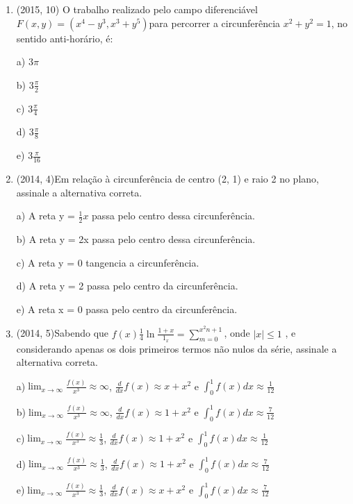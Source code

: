 \documentclass{article}
\begin{document}
\begin{enumerate}
\item (2015, 10) O trabalho realizado pelo campo diferenciável 
$F ( x , y)= ( x^4 - y^3 , x^3 + y^5 )$para percorrer a circunferência $x^2 + y^2 =1$, no sentido anti-horário, é:\newline


a) $ 3\pi$

b) $ 3\frac{\pi}{2}$

c) $ 3\frac{\pi}{4}$

d) $ 3\frac{\pi}{8}$

e) $ 3\frac{\pi}{16}$\newline



\item(2014, 4)Em relação à circunferência de centro (2, 1) e raio 2 no plano, assinale a alternativa correta.\newline


a) A reta y = $\frac{1}{2} x$ passa pelo centro dessa circunferência.

b) A reta y = 2x passa pelo centro dessa circunferência.

c) A reta y = 0 tangencia a circunferência.

d) A reta y = 2 passa pelo centro da circunferência.

e) A reta x = 0 passa pelo centro da circunferência.\newline




\item(2014, 5)Sabendo que $f (x) \frac{1}{4} \ln{\frac{1+x}{1_x}} = \sum_{m=0}^{x^2n+1}$, onde $|x|\leq 1$ , e considerando apenas os dois primeiros termos não nulos da série, assinale a alternativa correta.

a)$\lim_{x \to \infty} \frac{f(x)}{x^3} \approx \infty$, $\frac{d}{dx}f(x)\approx x + x^2$ e $\int_{0}^{1} f(x)dx \approx \frac{1}{12}$

b)$\lim_{x \to \infty} \frac{f(x)}{x^3} \approx \infty$, $\frac{d}{dx}f(x)\approx 1 + x^2$ e $\int_{0}^{1} f(x)dx \approx \frac{7}{12}$

c)$\lim_{x \to \infty} \frac{f(x)}{x^3} \approx \frac{1}{3}$, $\frac{d}{dx}f(x)\approx 1 + x^2$ e $\int_{0}^{1} f(x)dx \approx \frac{1}{12}$

d)$\lim_{x \to \infty} \frac{f(x)}{x^3} \approx \frac{1}{3}$, $\frac{d}{dx}f(x)\approx 1 + x^2$ e $\int_{0}^{1} f(x)dx \approx \frac{7}{12}$

e)$\lim_{x \to \infty} \frac{f(x)}{x^3} \approx \frac{1}{3}$, $\frac{d}{dx}f(x)\approx x + x^2$ e $\int_{0}^{1} f(x)dx \approx \frac{7}{12}$\newline







\end{enumerate}
\end{document}
